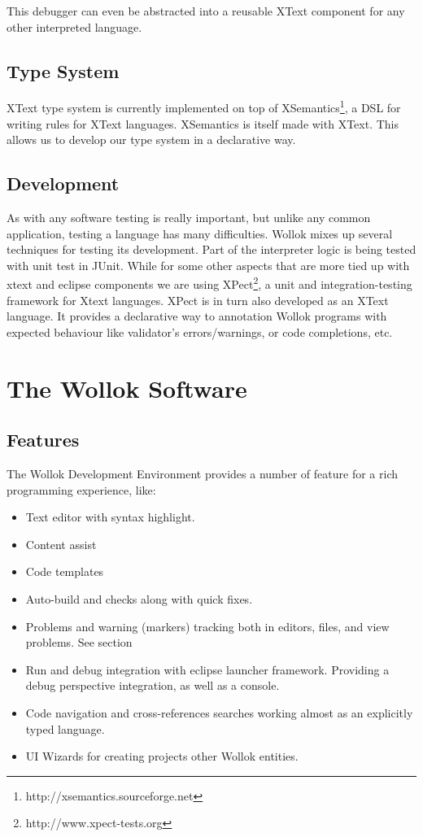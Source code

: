 This debugger can even be abstracted into a reusable XText component for any other interpreted language.

\subsection{Type System}

XText type system is currently implemented on top of XSemantics\footnote{http://xsemantics.sourceforge.net}, a DSL for writing rules for XText languages. XSemantics is itself made with XText.
This allows us to develop our type system in a declarative way.

\subsection{Development}

As with any software testing is really important, but unlike any common application, testing a language has many difficulties.
Wollok mixes up several techniques for testing its development.
Part of the interpreter logic is being tested with unit test in JUnit. While for some other aspects that are more tied up with xtext and eclipse components we are using XPect\footnote{http://www.xpect-tests.org}, a unit and integration-testing framework for Xtext languages.
XPect is in turn also developed as an XText language.
It provides a declarative way to annotation Wollok programs with expected behaviour like validator’s errors/warnings, or code completions,  etc.

\section{The Wollok Software}

\subsection{Features}

The Wollok Development Environment provides a number of feature for a rich programming experience, like:

\begin{itemize}
 \item Text editor with syntax highlight.
 \item Content assist
 \item Code templates
 \item Auto-build and checks along with quick fixes.
 \item Problems and warning (markers) tracking both in editors, files, and view problems. See section 
 \item Run and debug integration with eclipse launcher framework. Providing a debug perspective integration, as well as a console.
 \item Code navigation and cross-references searches working almost as an explicitly typed language.
 \item UI Wizards for creating projects other Wollok entities.
\end{itemize}


